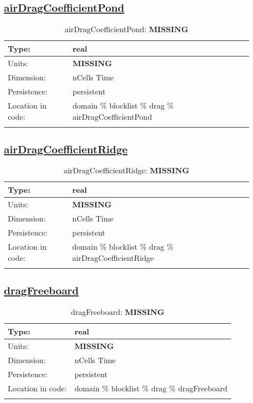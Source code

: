 \subsection[airDragCoefficientPond]{\hyperref[sec:var_tab_drag]{airDragCoefficientPond}}
\label{subsec:var_sec_drag_airDragCoefficientPond}
\begin{center}
\begin{longtable}{| p{2.0in} | p{4.0in} |}
        \hline 
        Type: & real \\
        \hline 
        Units: & {\bf \color{red} MISSING} \\
        \hline 
        Dimension: & nCells Time \\
        \hline 
        Persistence: & persistent \\
        \hline 
         Location in code: & domain \% blocklist \% drag \% airDragCoefficientPond \\
         \hline 
    \caption{airDragCoefficientPond: {\bf \color{red} MISSING}}
\end{longtable}
\end{center}
\subsection[airDragCoefficientRidge]{\hyperref[sec:var_tab_drag]{airDragCoefficientRidge}}
\label{subsec:var_sec_drag_airDragCoefficientRidge}
\begin{center}
\begin{longtable}{| p{2.0in} | p{4.0in} |}
        \hline 
        Type: & real \\
        \hline 
        Units: & {\bf \color{red} MISSING} \\
        \hline 
        Dimension: & nCells Time \\
        \hline 
        Persistence: & persistent \\
        \hline 
         Location in code: & domain \% blocklist \% drag \% airDragCoefficientRidge \\
         \hline 
    \caption{airDragCoefficientRidge: {\bf \color{red} MISSING}}
\end{longtable}
\end{center}
\subsection[dragFreeboard]{\hyperref[sec:var_tab_drag]{dragFreeboard}}
\label{subsec:var_sec_drag_dragFreeboard}
\begin{center}
\begin{longtable}{| p{2.0in} | p{4.0in} |}
        \hline 
        Type: & real \\
        \hline 
        Units: & {\bf \color{red} MISSING} \\
        \hline 
        Dimension: & nCells Time \\
        \hline 
        Persistence: & persistent \\
        \hline 
         Location in code: & domain \% blocklist \% drag \% dragFreeboard \\
         \hline 
    \caption{dragFreeboard: {\bf \color{red} MISSING}}
\end{longtable}
\end{center}
